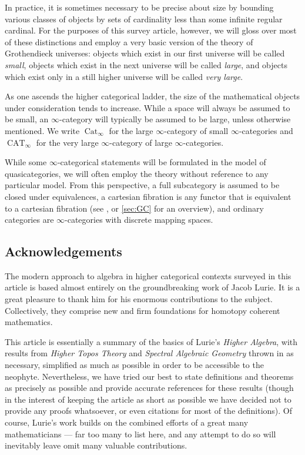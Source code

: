 \documentclass[12pt]{article}
\theoremstyle{definition}
\renewcommand{\i}{\infty}
\DeclareMathOperator{\Cat}{Cat}
\DeclareMathOperator{\CAT}{CAT}
\begin{document}
In practice, it is sometimes necessary to be precise about size by bounding various classes of objects by sets of cardinality less than some infinite regular cardinal.
For the purposes of this survey article, however, we will gloss over most of these distinctions and employ a very basic version of the theory of Grothendieck universes:
objects which exist in our first universe will be called {\em small}, objects which exist in the next universe will be called {\em large}, and objects which exist only in a still higher universe will be called {\em very large}.

As one ascends the higher categorical ladder, the size of the mathematical objects under consideration tends to increase.
While a space will always be assumed to be small, an $\infty$-category will typically be assumed to be large, unless otherwise mentioned.
 We write $\Cat_\i$
\index{$\Cat_\i$}
for the large $\i$-category of small $\i$-categories and $\CAT_\i$
\index{$\CAT_\i$}
for the very large $\i$-category of large $\i$-categories.

While some $\infty$-categorical statements will be formulated in the model of quasicategories, we will often employ the theory without reference to any particular model.
From this perspective, a full subcategory is assumed to be closed under equivalences, a cartesian fibration is any functor that is equivalent to a cartesian fibration (see \cite[Section 2.4]{HTT}, or \autoref{sec:GC} for an overview), and ordinary categories are $\infty$-categories with discrete mapping spaces.

\subsection{Acknowledgements}

The modern approach to algebra in higher categorical contexts surveyed in this article is based almost entirely on the groundbreaking work of Jacob Lurie.
It is a great pleasure to thank him for his enormous contributions to the subject.
Collectively, they comprise new and firm foundations for homotopy coherent mathematics.

This article is essentially a summary of the basics of Lurie's {\em Higher Algebra}, with results from {\em Higher Topos Theory} and {\em Spectral Algebraic Geometry} thrown in as necessary, simplified as much as possible in order to be accessible to the neophyte.
Nevertheless, we have tried our best to state definitions and theorems as precisely as possible and provide accurate references for these results (though in the interest of keeping the article as short as possible we have decided not to provide any proofs whatsoever, or even citations for most of the definitions).
Of course, Lurie's work builds on the combined efforts of a great many mathematicians --- far too many to list here, and any attempt to do so will inevitably leave omit many valuable contributions.
\end{document}
